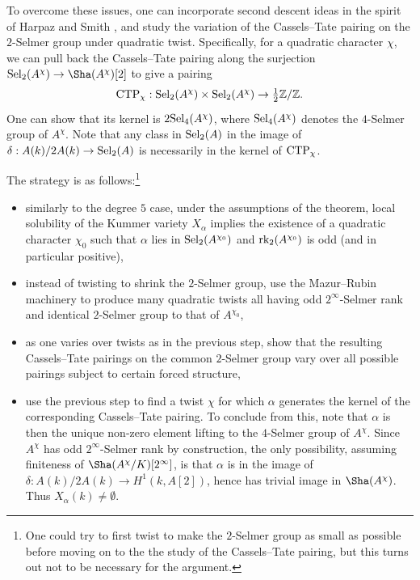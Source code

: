\documentclass[10pt]{amsart}
\numberwithin{equation}{section}
\theoremstyle{remark}
\theoremstyle{definition}
\theoremstyle{definition}
\theoremstyle{definition}
\theoremstyle{definition}
\theoremstyle{definition}
\theoremstyle{definition}
\theoremstyle{definition}
\theoremstyle{definition}
\begin{document}
To overcome these issues, one can incorporate second descent ideas in the spirit of Harpaz   \cite{Har19} and Smith \cite{smi16}, and study the variation of the Cassels--Tate pairing on the $2$-Selmer group under quadratic twist. Specifically, for a quadratic character $\chi$, we can pull back the Cassels--Tate pairing along the surjection $\textup{Sel}_2(A^\chi)\to \Sha(A^\chi)[2]$ to give a pairing
\[\textup{CTP}_\chi:\textup{Sel}_2(A^\chi)\times \textup{Sel}_2(A^\chi)\to \tfrac{1}{2}\mathbb{Z}/\mathbb{Z}.\]
One can show that its kernel is $2\textup{Sel}_4(A^\chi)$, where $\textup{Sel}_4(A^\chi)$ denotes the $4$-Selmer group of $A^\chi$. Note  that any class in $\textup{Sel}_2(A)$ in the image of $\delta:A(k)/2A(k)\to \textup{Sel}_2(A)$ is necessarily in the kernel of $\textup{CTP}_\chi$. 

The strategy is as follows:\footnote{One could try to first twist to make the $2$-Selmer group as small as possible before moving on to the the study of the Cassels--Tate pairing, but this turns out not to be necessary for the argument.}
\begin{itemize}
\item[(1)] similarly to the degree $5$ case,  under the assumptions of the theorem, local solubility of the Kummer variety $X_\alpha$ implies the existence of a quadratic character $\chi_0$ such that $\alpha$ lies in $\textup{Sel}_2(A^{\chi_0})$ and   $\textup{rk}_2(A^{\chi_0})$ is odd (and in particular positive),
\item[(2)] instead of twisting to shrink the $2$-Selmer group, use the Mazur--Rubin machinery to produce many quadratic twists all having odd $2^\infty$-Selmer rank and identical $2$-Selmer group to that of $A^{\chi_0}$,
\item[(3)] as one varies over twists as in the previous step, show that the resulting Cassels--Tate pairings on the common $2$-Selmer group vary over all possible pairings subject to certain forced structure,
\item[(4)] use the previous step to find a twist $\chi$ for which $\alpha$ generates the kernel of the corresponding Cassels--Tate pairing. To conclude from this, note that $\alpha$ is then the unique non-zero element lifting to the $4$-Selmer group of $A^\chi$. Since $A^\chi$ has odd  $2^\infty$-Selmer rank by construction, the only possibility, assuming finiteness of $\Sha(A^\chi/K)[2^\infty]$, is that $\alpha$ is in the image of $\delta:A(k)/2A(k)\to H^1(k,A[2])$, hence has trivial image in $\Sha(A^\chi)$. Thus $X_\alpha(k)\neq \emptyset$.
\end{itemize}
\end{document}
